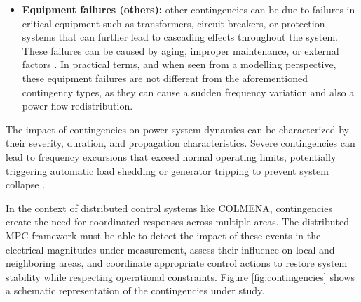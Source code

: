 \documentclass{article}
\begin{document}
\begin{itemize}
\item \textbf{Equipment failures (others):} other contingencies can be due to failures in critical equipment such as transformers, circuit breakers, or protection systems that can further lead to cascading effects throughout the system. These failures can be caused by aging, improper maintenance, or external factors \cite{li2006power}. In practical terms, and when seen from a modelling perspective, these equipment failures are not different from the aforementioned contingency types, as they can cause a sudden frequency variation and also a power flow redistribution. 

\end{itemize}

The impact of contingencies on power system dynamics can be characterized by their severity, duration, and propagation characteristics. Severe contingencies can lead to frequency excursions that exceed normal operating limits, potentially triggering automatic load shedding or generator tripping to prevent system collapse \cite{contingency:stability}.

In the context of distributed control systems like COLMENA, contingencies create the need for coordinated responses across multiple areas. The distributed MPC framework must be able to detect the impact of these events in the electrical magnitudes under measurement, assess their influence on local and neighboring areas, and coordinate appropriate control actions to restore system stability while respecting operational constraints. Figure \ref{fig:contingencies} shows a schematic representation of the contingencies under study.
\end{document}

